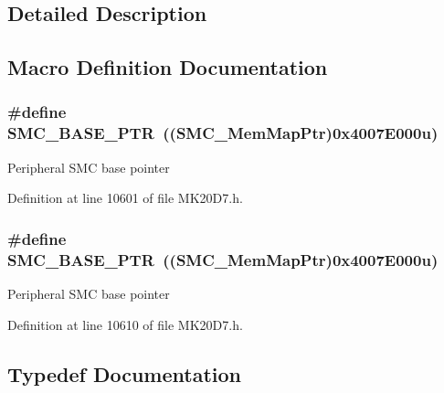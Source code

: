 \subsection{Detailed Description}


\subsection{Macro Definition Documentation}
\subsubsection[{\texorpdfstring{S\+M\+C\+\_\+\+B\+A\+S\+E\+\_\+\+P\+TR}{SMC_BASE_PTR}}]{\setlength{\rightskip}{0pt plus 5cm}\#define S\+M\+C\+\_\+\+B\+A\+S\+E\+\_\+\+P\+TR~(({\bf S\+M\+C\+\_\+\+Mem\+Map\+Ptr})0x4007\+E000u)}\hypertarget{group___s_m_c___peripheral_ga31b6c4571795341e6446800243313e56}{}\label{group___s_m_c___peripheral_ga31b6c4571795341e6446800243313e56}
Peripheral S\+MC base pointer 

Definition at line 10601 of file M\+K20\+D7.\+h.

\subsubsection[{\texorpdfstring{S\+M\+C\+\_\+\+B\+A\+S\+E\+\_\+\+P\+TR}{SMC_BASE_PTR}}]{\setlength{\rightskip}{0pt plus 5cm}\#define S\+M\+C\+\_\+\+B\+A\+S\+E\+\_\+\+P\+TR~(({\bf S\+M\+C\+\_\+\+Mem\+Map\+Ptr})0x4007\+E000u)}\hypertarget{group___s_m_c___peripheral_ga31b6c4571795341e6446800243313e56}{}\label{group___s_m_c___peripheral_ga31b6c4571795341e6446800243313e56}
Peripheral S\+MC base pointer 

Definition at line 10610 of file M\+K20\+D7.\+h.



\subsection{Typedef Documentation}

